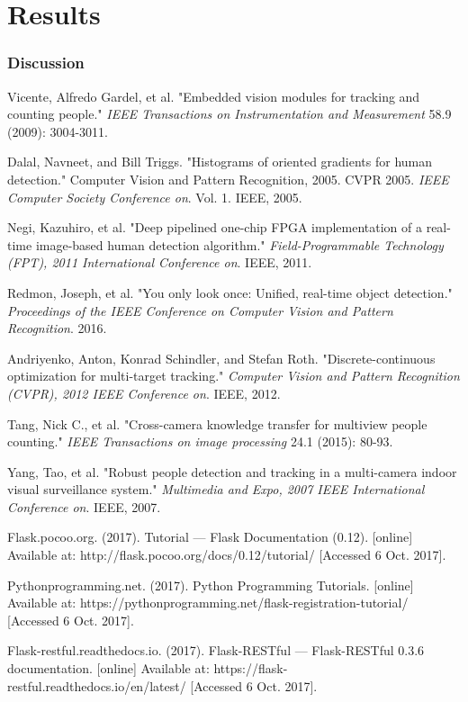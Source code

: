 \documentclass[12pt,a4paper]{report}
\begin{document}
\chapter{Results}


\subsection{Discussion}



\newpage
\begin{thebibliography}{10}

Vicente, Alfredo Gardel, et al. "Embedded vision modules for tracking and counting people." \textit{IEEE Transactions on Instrumentation and Measurement} 58.9 (2009): 3004-3011.

Dalal, Navneet, and Bill Triggs. "Histograms of oriented gradients for human detection." Computer Vision and Pattern Recognition, 2005. CVPR 2005. \textit{IEEE Computer Society Conference on}. Vol. 1. IEEE, 2005.

Negi, Kazuhiro, et al. "Deep pipelined one-chip FPGA implementation of a real-time image-based human detection algorithm." \textit{Field-Programmable Technology (FPT), 2011 International Conference on}. IEEE, 2011.

Redmon, Joseph, et al. "You only look once: Unified, real-time object detection." \textit{Proceedings of the IEEE Conference on Computer Vision and Pattern Recognition}. 2016.

Andriyenko, Anton, Konrad Schindler, and Stefan Roth. "Discrete-continuous optimization for multi-target tracking." \textit{Computer Vision and Pattern Recognition (CVPR), 2012 IEEE Conference on}. IEEE, 2012.

Tang, Nick C., et al. "Cross-camera knowledge transfer for multiview people counting." \textit{IEEE Transactions on image processing} 24.1 (2015): 80-93.

Yang, Tao, et al. "Robust people detection and tracking in a multi-camera indoor visual surveillance system." \textit{Multimedia and Expo, 2007 IEEE International Conference on}. IEEE, 2007.

Flask.pocoo.org. (2017). Tutorial — Flask Documentation (0.12). [online] Available at: http://flask.pocoo.org/docs/0.12/tutorial/ [Accessed 6 Oct. 2017].

Pythonprogramming.net. (2017). Python Programming Tutorials. [online] Available at: https://pythonprogramming.net/flask-registration-tutorial/ [Accessed 6 Oct. 2017].

Flask-restful.readthedocs.io. (2017). Flask-RESTful — Flask-RESTful 0.3.6 documentation. [online] Available at: https://flask-restful.readthedocs.io/en/latest/ [Accessed 6 Oct. 2017].
\end{thebibliography}
\end{document}
